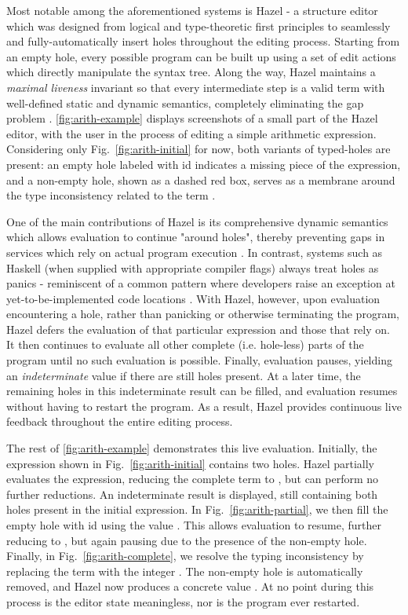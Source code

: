 Most notable among the aforementioned systems is Hazel - a structure editor which was designed from logical and type-theoretic first principles to seamlessly and fully-automatically insert holes throughout the editing process. Starting from an empty hole, every possible program can be built up using a set of edit actions which directly manipulate the syntax tree. Along the way, Hazel maintains a \emph{maximal liveness} invariant so that every intermediate step is a valid term with well-defined static and dynamic semantics, completely eliminating the gap problem \cite{DBLP:journals/pacmpl/OmarVCH19}. \autoref{fig:arith-example} displays screenshots of a small part of the Hazel editor, with the user in the process of editing a simple arithmetic expression. Considering only Fig.~\ref{fig:arith-initial} for now, both variants of typed-holes are present: an empty hole labeled with id  indicates a missing piece of the expression, and a non-empty hole, shown as a dashed red box, serves as a membrane around the type inconsistency related to the term .

One of the main contributions of Hazel is its comprehensive dynamic semantics which allows evaluation to continue "around holes", thereby preventing gaps in services which rely on actual program execution \cite{DBLP:journals/pacmpl/OmarVCH19}. In contrast, systems such as Haskell (when supplied with appropriate compiler flags) always treat holes as panics - reminiscent of a common pattern where developers raise an exception at yet-to-be-implemented code locations \cite{GHCHoles}. With Hazel, however, upon evaluation encountering a hole, rather than panicking or otherwise terminating the program, Hazel defers the evaluation of that particular expression and those that rely on. It then continues to evaluate all other complete (i.e. hole-less) parts of the program until no such evaluation is possible. Finally, evaluation pauses, yielding an \emph{indeterminate} value if there are still holes present. At a later time, the remaining holes in this indeterminate result can be filled, and evaluation resumes without having to restart the program. As a result, Hazel provides continuous live feedback throughout the entire editing process.

The rest of \autoref{fig:arith-example} demonstrates this live evaluation. Initially, the expression shown in Fig.~\ref{fig:arith-initial} contains two holes. Hazel partially evaluates the expression, reducing the complete term  to , but can perform no further reductions. An indeterminate result is displayed, still containing both holes present in the initial expression. In Fig.~\ref{fig:arith-partial}, we then fill the empty hole with id  using the value . This allows evaluation to resume, further reducing  to , but again pausing due to the presence of the non-empty hole. Finally, in Fig.~\ref{fig:arith-complete}, we resolve the typing inconsistency by replacing the term  with the integer . The non-empty hole is automatically removed, and Hazel now produces a concrete value . At no point during this process is the editor state meaningless, nor is the program ever restarted.


